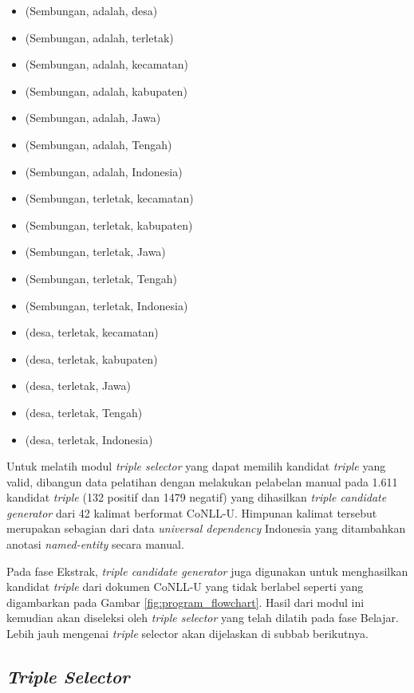\begin{itemize}
\item (Sembungan, adalah, desa) 
\item (Sembungan, adalah, terletak)
\item (Sembungan, adalah, kecamatan)
\item (Sembungan, adalah, kabupaten)
\item (Sembungan, adalah, Jawa)
\item (Sembungan, adalah, Tengah)
\item (Sembungan, adalah, Indonesia)
\item (Sembungan, terletak, kecamatan) 
\item (Sembungan, terletak, kabupaten) 
\item (Sembungan, terletak, Jawa) 
\item (Sembungan, terletak, Tengah)
\item (Sembungan, terletak, Indonesia) 
\item (desa, terletak, kecamatan)
\item (desa, terletak, kabupaten)
\item (desa, terletak, Jawa)
\item (desa, terletak, Tengah)
\item (desa, terletak, Indonesia)
\end{itemize}

Untuk melatih modul \textit{triple selector} yang dapat memilih kandidat \textit{triple} yang valid, dibangun data pelatihan dengan melakukan pelabelan manual pada 1.611 kandidat \textit{triple} (132 positif dan 1479 negatif) yang dihasilkan \textit{triple candidate generator} dari 42 kalimat berformat CoNLL-U. Himpunan kalimat tersebut merupakan sebagian dari data \textit{universal dependency} Indonesia yang ditambahkan anotasi \textit{named-entity} secara manual.

Pada fase Ekstrak, \textit{triple candidate generator} juga digunakan untuk menghasilkan kandidat \textit{triple} dari dokumen CoNLL-U yang tidak berlabel seperti yang digambarkan pada Gambar \ref{fig:program_flowchart}. Hasil dari modul ini kemudian akan diseleksi oleh \textit{triple selector} yang telah dilatih pada fase Belajar. Lebih jauh mengenai \textit{triple} selector akan dijelaskan di subbab berikutnya.

\subsection{\textit{Triple Selector}}  \label{Triple Selector}

